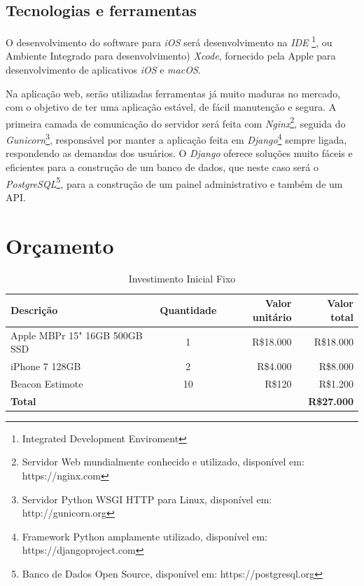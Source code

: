 \documentclass[
	12pt,
	oneside,
	a4paper,
	english,
	brazil,
]{abntex2}
\begin{document}
\section{Tecnologias e ferramentas}

O desenvolvimento do software para \emph{iOS} será desenvolvimento na \emph{IDE} \footnote{Integrated Development Enviroment}, ou Ambiente Integrado para desenvolvimento) \emph{Xcode}, fornecido pela Apple para desenvolvimento de aplicativos \emph{iOS} e \emph{macOS}.

Na aplicação web, serão utilizadas ferramentas já muito maduras no mercado, com o objetivo de ter uma aplicação estável, de fácil manutenção e segura. A primeira camada de comunicação do servidor será feita com \emph{Nginx}\footnote{Servidor Web mundialmente conhecido e utilizado, disponível em: https://nginx.com}, seguida do \emph{Gunicorn}\footnote{Servidor Python WSGI HTTP para Linux, disponível em: http://gunicorn.org}, responsável por manter a aplicação feita em \emph{Django}\footnote{Framework Python amplamente utilizado, disponível em: https://djangoproject.com} sempre ligada, respondendo as demandas dos usuários. O \emph{Django} oferece soluções muito fáceis e eficientes para a construção de um banco de dados, que neste caso será o \emph{PostgreSQL}\footnote{Banco de Dados Open Source, disponível em: https://postgresql.org}, para a construção de um painel administrativo e também de um API.



\chapter{Orçamento}

\noindent
\begin{table}[ht]
    \caption{Investimento Inicial Fixo}
    
    \begin{tabularx}{\textwidth}{X|c|r|r}
    \hline
        \textbf{Descrição} &
        \textbf{Quantidade} & 
        \textbf{Valor unitário} & 
        \textbf{Valor total} \\
    \hline
        Apple MBPr 15" 16GB 500GB SSD&1&R\$18.000&R\$18.000 \\
        iPhone 7 128GB&2&R\$4.000&R\$8.000 \\
        Beacon Estimote&10&R\$120&R\$1.200 \\ [1ex]
    \hline
        \textbf{Total}&&&\textbf{R\$27.000} \\ [1ex]
    \end{tabularx}
\end{table}
\end{document}
